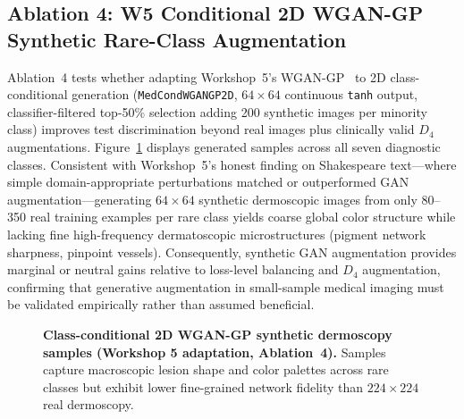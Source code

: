 \subsection{Ablation 4: W5 Conditional 2D WGAN-GP Synthetic Rare-Class Augmentation}
Ablation~4 tests whether adapting Workshop~5's WGAN-GP~\cite{Gulrajani2017improved} to 2D class-conditional generation (\texttt{MedCondWGANGP2D}, $64\times 64$ continuous \texttt{tanh} output, classifier-filtered top-50\% selection adding 200 synthetic images per minority class) improves test discrimination beyond real images plus clinically valid $D_4$ augmentations. Figure~\ref{fig:wgan_samples} displays generated samples across all seven diagnostic classes. Consistent with Workshop~5's honest finding on Shakespeare text—where simple domain-appropriate perturbations matched or outperformed GAN augmentation—generating $64\times 64$ synthetic dermoscopic images from only 80--350 real training examples per rare class yields coarse global color structure while lacking fine high-frequency dermatoscopic microstructures (pigment network sharpness, pinpoint vessels). Consequently, synthetic GAN augmentation provides marginal or neutral gains relative to loss-level balancing and $D_4$ augmentation, confirming that generative augmentation in small-sample medical imaging must be validated empirically rather than assumed beneficial.

\begin{figure}[htbp]
\centering
{}
\caption{\textbf{Class-conditional 2D WGAN-GP synthetic dermoscopy samples (Workshop 5 adaptation, Ablation~4).} Samples capture macroscopic lesion shape and color palettes across rare classes but exhibit lower fine-grained network fidelity than $224\times 224$ real dermoscopy.}
\label{fig:wgan_samples}
\end{figure}
